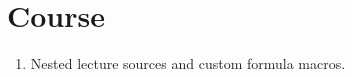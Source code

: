 \documentclass{report}
\begin{document}
\chapter{Course}
\begin{enumerate}[label=\arabic*.]
  \item Nested lecture sources and custom formula macros.
\end{enumerate}
\end{document}
